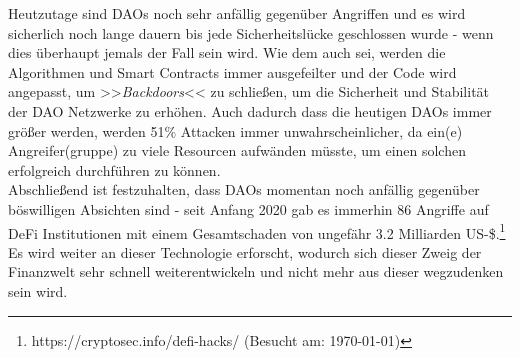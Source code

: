 \documentclass[a4paper,12pt]{report}
\begin{document}
	Heutzutage sind DAOs noch sehr anfällig gegenüber Angriffen und es wird sicherlich noch lange dauern bis jede Sicherheitslücke geschlossen wurde - wenn dies überhaupt jemals der Fall sein wird. Wie dem auch sei, werden die Algorithmen und Smart Contracts immer ausgefeilter und der Code wird angepasst, um >>\textit{Backdoors}<< zu schließen, um die Sicherheit und Stabilität der DAO Netzwerke zu erhöhen. Auch dadurch dass die heutigen DAOs immer größer werden, werden 51\% Attacken immer unwahrscheinlicher, da ein(e) Angreifer(gruppe) zu viele Resourcen aufwänden müsste, um einen solchen erfolgreich durchführen zu können. \\
	Abschließend ist festzuhalten, dass DAOs momentan noch anfällig gegenüber böswilligen Absichten sind - seit Anfang 2020 gab es immerhin 86 Angriffe auf DeFi Institutionen mit einem Gesamtschaden von ungefähr 3.2 Milliarden US-\$.\footnote{\hspace{0.5em} https://cryptosec.info/defi-hacks/ (Besucht am: \today)} Es wird weiter an dieser Technologie erforscht, wodurch sich dieser Zweig der Finanzwelt sehr schnell weiterentwickeln und nicht mehr aus dieser wegzudenken sein wird. \\
	
\end{document}
